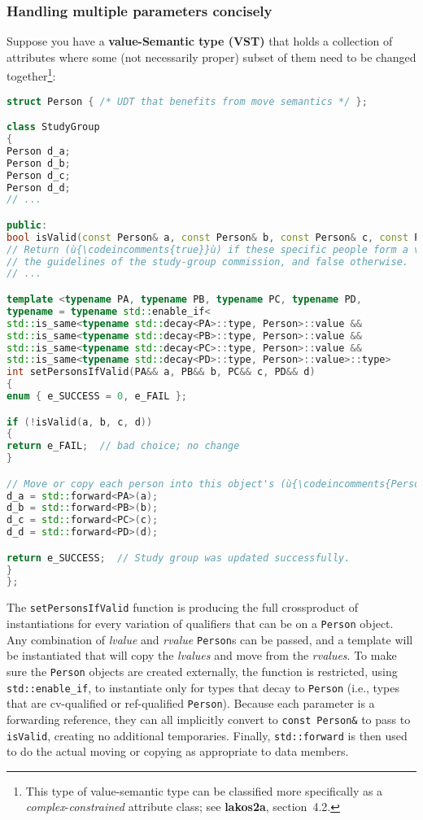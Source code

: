 \subsubsection[Handling multiple parameters concisely]{Handling multiple parameters concisely}\label{handling-multiple-parameters-concisely}

Suppose you have a \textbf{value-Semantic type (VST)} that holds a
collection of attributes where some (not necessarily proper) subset of
them need to be changed together{\cprotect\footnote{This type of
value-semantic type can be classified more specifically as a
\emph{complex}-\emph{constrained} attribute class; see \textbf{lakos2a}, section~4.2.}}:

\begin{lstlisting}[language=C++]
struct Person { /* UDT that benefits from move semantics */ };

class StudyGroup
{
Person d_a;
Person d_b;
Person d_c;
Person d_d;
// ...

public:
bool isValid(const Person& a, const Person& b, const Person& c, const Person& d);
// Return (ù{\codeincomments{true}}ù) if these specific people form a valid study group under
// the guidelines of the study-group commission, and false otherwise.
// ...

template <typename PA, typename PB, typename PC, typename PD,
typename = typename std::enable_if<
std::is_same<typename std::decay<PA>::type, Person>::value &&
std::is_same<typename std::decay<PB>::type, Person>::value &&
std::is_same<typename std::decay<PC>::type, Person>::value &&
std::is_same<typename std::decay<PD>::type, Person>::value>::type>
int setPersonsIfValid(PA&& a, PB&& b, PC&& c, PD&& d)
{
enum { e_SUCCESS = 0, e_FAIL };

if (!isValid(a, b, c, d))
{
return e_FAIL;  // bad choice; no change
}

// Move or copy each person into this object's (ù{\codeincomments{Person}}ù) data members:
d_a = std::forward<PA>(a);
d_b = std::forward<PB>(b);
d_c = std::forward<PC>(c);
d_d = std::forward<PD>(d);

return e_SUCCESS;  // Study group was updated successfully.
}
};
\end{lstlisting}

\noindent The \texttt{setPersonsIfValid} function is producing the full crossproduct of instantiations for every variation of qualifiers that can be
on a \texttt{Person} object. Any combination of \emph{lvalue} and
\emph{rvalue} \texttt{Person}s can be passed, and a template will be
instantiated that will copy the \emph{lvalues} and move from the
\emph{rvalues}. To make sure the \texttt{Person} objects are
created externally, the function is restricted, using
\texttt{std::enable\_if}, to instantiate only for types that decay to
\texttt{Person} (i.e., types that are cv-qualified or ref-qualified
\texttt{Person}). Because each parameter is a forwarding reference, they
can all implicitly convert to \texttt{const}~\texttt{Person\&} to pass
to \texttt{isValid}, creating no additional temporaries. Finally,
\texttt{std::forward} is then used to do the actual moving or copying as
appropriate to data members.

